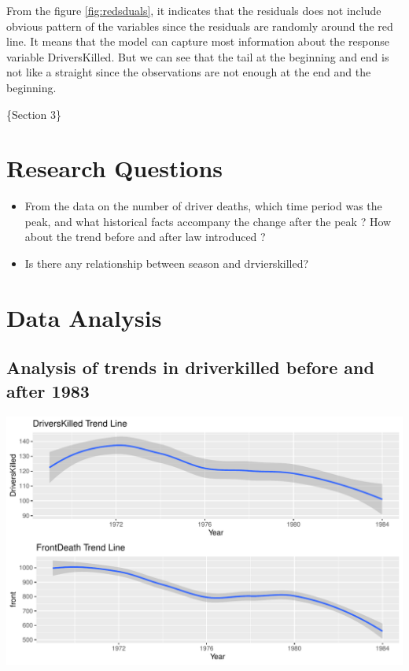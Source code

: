 \documentclass[11pt,a4paper,]{article}
\begin{document}
From the figure \ref{fig:redsduals}, it indicates that the residuals does not include obvious pattern of the variables since the residuals are randomly around the red line. It means that the model can capture most information about the response variable DriversKilled. But we can see that the tail at the beginning and end is not like a straight since the observations are not enough at the end and the beginning.

\{Section 3\}

\hypertarget{research-questions}{%
\section{Research Questions}\label{research-questions}}

\begin{itemize}
\item
  From the data on the number of driver deaths, which time period was the peak, and what historical facts accompany the change after the peak ? How about the trend before and after law introduced ?
\item
  Is there any relationship between season and drvierskilled?
\end{itemize}

\hypertarget{data-analysis}{%
\section{Data Analysis}\label{data-analysis}}

\hypertarget{analysis-of-trends-in-driverkilled-before-and-after-1983}{%
\subsection{Analysis of trends in driverkilled before and after 1983}\label{analysis-of-trends-in-driverkilled-before-and-after-1983}}

\includegraphics{report_files/figure-latex/figureE-1.pdf}
\end{document}
